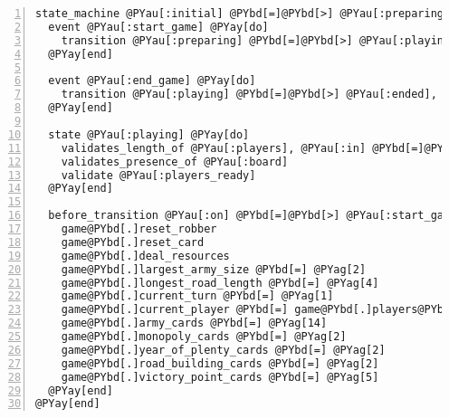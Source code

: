 \begin{Verbatim}[commandchars=@\[\],numbers=left,firstnumber=1,stepnumber=1]
state_machine @PYau[:initial] @PYbd[=]@PYbd[>] @PYau[:preparing] @PYay[do]
  event @PYau[:start_game] @PYay[do]
    transition @PYau[:preparing] @PYbd[=]@PYbd[>] @PYau[:playing]
  @PYay[end]

  event @PYau[:end_game] @PYay[do]
    transition @PYau[:playing] @PYbd[=]@PYbd[>] @PYau[:ended], @PYau[:if] @PYbd[=]@PYbd[>] @PYau[:winner?]
  @PYay[end]

  state @PYau[:playing] @PYay[do]
    validates_length_of @PYau[:players], @PYau[:in] @PYbd[=]@PYbd[>] @PYag[3]@PYbd[.].@PYag[4]
    validates_presence_of @PYau[:board]
    validate @PYau[:players_ready]
  @PYay[end]

  before_transition @PYau[:on] @PYbd[=]@PYbd[>] @PYau[:start_game] @PYay[do] @PYbd[|]game@PYbd[|]
    game@PYbd[.]reset_robber
    game@PYbd[.]reset_card
    game@PYbd[.]deal_resources
    game@PYbd[.]largest_army_size @PYbd[=] @PYag[2]
    game@PYbd[.]longest_road_length @PYbd[=] @PYag[4]
    game@PYbd[.]current_turn @PYbd[=] @PYag[1]
    game@PYbd[.]current_player @PYbd[=] game@PYbd[.]players@PYbd[.]first
    game@PYbd[.]army_cards @PYbd[=] @PYag[14]
    game@PYbd[.]monopoly_cards @PYbd[=] @PYag[2]
    game@PYbd[.]year_of_plenty_cards @PYbd[=] @PYag[2]
    game@PYbd[.]road_building_cards @PYbd[=] @PYag[2]
    game@PYbd[.]victory_point_cards @PYbd[=] @PYag[5]
  @PYay[end]
@PYay[end]
\end{Verbatim}
